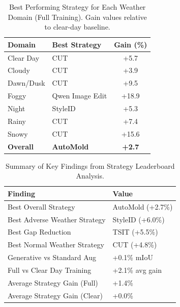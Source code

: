 
\begin{table}[t]
\centering
\caption{Best Performing Strategy for Each Weather Domain (Full Training). Gain values relative to clear-day baseline.}
\label{tab:domain_best}
\begin{tabular}{@{}llc@{}}
\toprule
\textbf{Domain} & \textbf{Best Strategy} & \textbf{Gain (\%)} \\
\midrule
Clear Day & CUT & +5.7 \\
Cloudy & CUT & +3.9 \\
Dawn/Dusk & CUT & +9.5 \\
Foggy & Qwen Image Edit & +18.9 \\
Night & StyleID & +5.3 \\
Rainy & CUT & +7.4 \\
Snowy & CUT & +15.6 \\
\midrule
\textbf{Overall} & \textbf{AutoMold} & \textbf{+2.7} \\
\bottomrule
\end{tabular}
\end{table}



\begin{table}[t]
\centering
\caption{Summary of Key Findings from Strategy Leaderboard Analysis.}
\label{tab:key_findings}
\begin{tabular}{@{}ll@{}}
\toprule
\textbf{Finding} & \textbf{Value} \\
\midrule
Best Overall Strategy & AutoMold (+2.7\%) \\
Best Adverse Weather Strategy & StyleID (+6.0\%) \\
Best Gap Reduction & TSIT (+5.5\%) \\
Best Normal Weather Strategy & CUT (+4.8\%) \\
\midrule
Generative vs Standard Aug & +0.1\% mIoU \\
Full vs Clear Day Training & +2.1\% avg gain \\
\midrule
Average Strategy Gain (Full) & +1.4\% \\
Average Strategy Gain (Clear) & +0.0\% \\
\bottomrule
\end{tabular}
\end{table}


